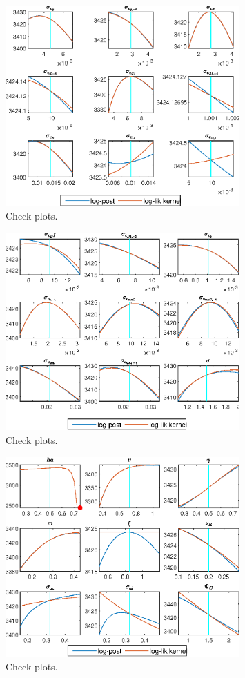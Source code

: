  
\begin{figure}[H]
\centering 
\includegraphics[width=0.80\textwidth]{BRS_sectoral_rest/graphs/BRS_sectoral_rest_CheckPlots1}
\caption{Check plots.}\label{Fig:CheckPlots:1}
\end{figure}
 
\begin{figure}[H]
\centering 
\includegraphics[width=0.80\textwidth]{BRS_sectoral_rest/graphs/BRS_sectoral_rest_CheckPlots2}
\caption{Check plots.}\label{Fig:CheckPlots:2}
\end{figure}
 
\begin{figure}[H]
\centering 
\includegraphics[width=0.80\textwidth]{BRS_sectoral_rest/graphs/BRS_sectoral_rest_CheckPlots3}
\caption{Check plots.}\label{Fig:CheckPlots:3}
\end{figure}
 
